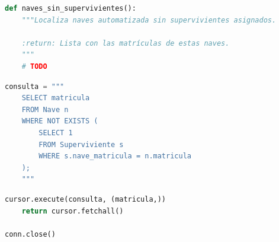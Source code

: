 \documentclass[
    12pt,
    a4paper,
    addpoints,
    answers,
    convocatoria=ord,
    titulacion=CD,
    curso=2025/2026,
]{db-exam}
\begin{document}
\begin{questions}
\begin{lstlisting}[language=Python]
def naves_sin_supervivientes():
    """Localiza naves automatizada sin supervivientes asignados.

    :return: Lista con las matrículas de estas naves.
    """
    # TODO
\end{lstlisting}

\begin{solutionorbox}
\begin{lstlisting}[language=Python]
    consulta = """
    SELECT matricula 
    FROM Nave n
    WHERE NOT EXISTS (
        SELECT 1
        FROM Superviviente s
        WHERE s.nave_matricula = n.matricula
    );
    """
\end{lstlisting}
\end{solutionorbox}

\begin{lstlisting}[language=Python]
    cursor.execute(consulta, (matricula,))
    return cursor.fetchall()

conn.close()
\end{lstlisting}

\end{questions}
\end{document}
